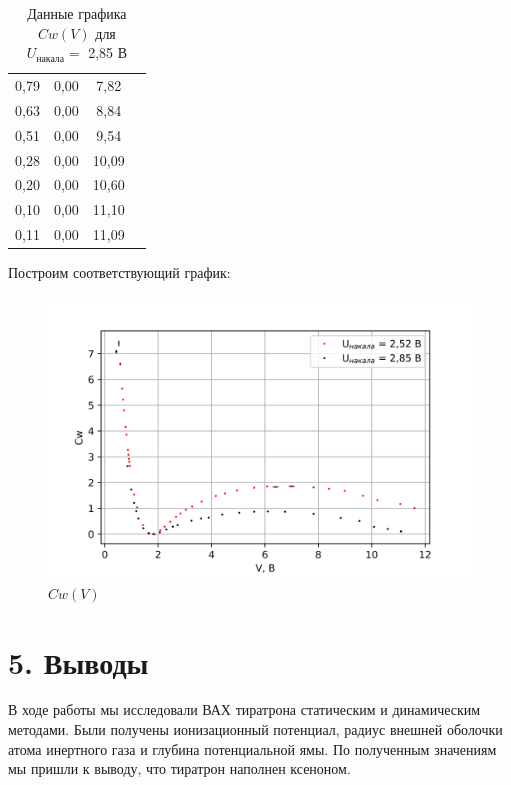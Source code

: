 \documentclass[a4paper,12pt]{report}
\begin{document}
\begin{table}[H]
\begin{tabular}{|c|c|c|c|}
0,79 & 0,00    & 7,82  &                        \\ \cline{1-3}
0,63 & 0,00    & 8,84  &                        \\ \cline{1-3}
0,51 & 0,00    & 9,54  &                        \\ \cline{1-3}
0,28 & 0,00    & 10,09 &                        \\ \cline{1-3}
0,20 & 0,00    & 10,60 &                        \\ \cline{1-3}
0,10 & 0,00    & 11,10 &                        \\ \cline{1-3}
0,11 & 0,00    & 11,09 &                        \\ \hline
\end{tabular}
\caption{Данные графика $Cw(V)$ для $U_{\text{накала}}=$ 2,85 В}
\end{table}

Построим соответствующий график:

\begin{figure}[H]
    \centering
    \includegraphics[width=14cm]{Cw(V).png}
    \caption{$Cw(V)$}
    \label{fig:vac}
\end{figure}

\section*{5. Выводы}
В ходе работы мы исследовали ВАХ тиратрона статическим и динамическим методами. Были получены ионизационный потенциал, радиус внешней оболочки атома инертного газа и глубина потенциальной ямы. По полученным значениям мы пришли к выводу, что тиратрон наполнен ксеноном.
\end{document}
